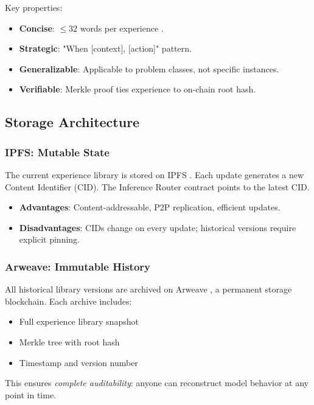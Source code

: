 \documentclass[11pt,a4paper]{article}
\begin{document}
Key properties:
\begin{itemize}
\item \textbf{Concise}: $\leq 32$ words per experience \cite{tencent2025grpo}.
\item \textbf{Strategic}: "When [context], [action]" pattern.
\item \textbf{Generalizable}: Applicable to problem classes, not specific instances.
\item \textbf{Verifiable}: Merkle proof ties experience to on-chain root hash.
\end{itemize}

\subsection{Storage Architecture}

\subsubsection{IPFS: Mutable State}

The current experience library is stored on IPFS \cite{benet2014ipfs}. Each update generates a new Content Identifier (CID). The Inference Router contract points to the latest CID.

\begin{itemize}
\item \textbf{Advantages}: Content-addressable, P2P replication, efficient updates.
\item \textbf{Disadvantages}: CIDs change on every update; historical versions require explicit pinning.
\end{itemize}

\subsubsection{Arweave: Immutable History}

All historical library versions are archived on Arweave \cite{arweave2018whitepaper}, a permanent storage blockchain. Each archive includes:
\begin{itemize}
\item Full experience library snapshot
\item Merkle tree with root hash
\item Timestamp and version number
\end{itemize}

This ensures \textit{complete auditability}: anyone can reconstruct model behavior at any point in time.
\end{document}
